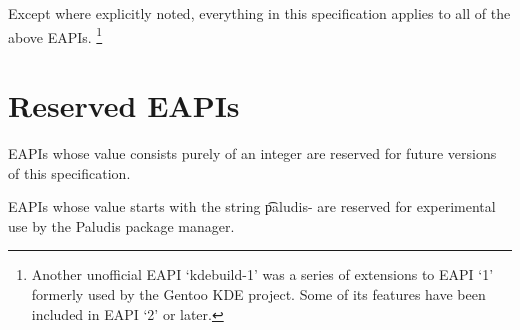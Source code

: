 Except where explicitly noted, everything in this specification
applies to all of the above EAPIs.%
\footnote{Another unofficial EAPI `kdebuild-1' was a series of
    extensions to EAPI `1' formerly used by the Gentoo KDE project.
    Some of its features have been included in EAPI `2' or later.}

\section{Reserved EAPIs}

\begin{compactitem}
\item EAPIs whose value consists purely of an integer are reserved for future versions of this
    specification.
\item EAPIs whose value starts with the string \t{paludis-} are reserved for experimental
    use by the Paludis package manager.
\end{compactitem}


